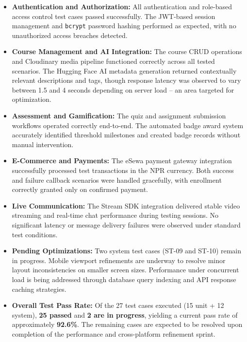 \begin{itemize}
    \item \textbf{Authentication and Authorization:} All authentication and role-based access control test cases passed successfully. The JWT-based session management and \texttt{bcrypt} password hashing performed as expected, with no unauthorized access breaches detected.

    \item \textbf{Course Management and AI Integration:} The course CRUD operations and Cloudinary media pipeline functioned correctly across all tested scenarios. The Hugging Face AI metadata generation returned contextually relevant descriptions and tags, though response latency was observed to vary between 1.5 and 4 seconds depending on server load -- an area targeted for optimization.

    \item \textbf{Assessment and Gamification:} The quiz and assignment submission workflows operated correctly end-to-end. The automated badge award system accurately identified threshold milestones and created badge records without manual intervention.

    \item \textbf{E-Commerce and Payments:} The eSewa payment gateway integration successfully processed test transactions in the NPR currency. Both success and failure callback scenarios were handled gracefully, with enrollment correctly granted only on confirmed payment.

    \item \textbf{Live Communication:} The Stream SDK integration delivered stable video streaming and real-time chat performance during testing sessions. No significant latency or message delivery failures were observed under standard test conditions.

    \item \textbf{Pending Optimizations:} Two system test cases (ST-09 and ST-10) remain in progress. Mobile viewport refinements are underway to resolve minor layout inconsistencies on smaller screen sizes. Performance under concurrent load is being addressed through database query indexing and API response caching strategies.

    \item \textbf{Overall Test Pass Rate:} Of the 27 test cases executed (15 unit + 12 system), \textbf{25 passed} and \textbf{2 are in progress}, yielding a current pass rate of approximately \textbf{92.6\%}. The remaining cases are expected to be resolved upon completion of the performance and cross-platform refinement sprint.
\end{itemize}
